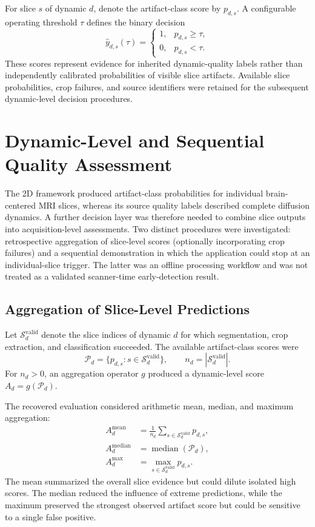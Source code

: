 For slice $s$ of dynamic $d$, denote the artifact-class score by $p_{d,s}$. A configurable operating threshold $\tau$ defines the binary decision
\begin{equation}
\hat y_{d,s}(\tau)=
\begin{cases}
1,&p_{d,s}\geq\tau,\\
0,&p_{d,s}<\tau.
\end{cases}
\end{equation}
These scores represent evidence for inherited dynamic-quality labels rather than independently calibrated probabilities of visible slice artifacts. Available slice probabilities, crop failures, and source identifiers were retained for the subsequent dynamic-level decision procedures.

\section{Dynamic-Level and Sequential Quality Assessment}
\label{sec:dynamic_sequential_assessment}

The 2D framework produced artifact-class probabilities for individual brain-centered MRI slices, whereas its source quality labels described complete diffusion dynamics. A further decision layer was therefore needed to combine slice outputs into acquisition-level assessments. Two distinct procedures were investigated: retrospective aggregation of slice-level scores (optionally incorporating crop failures) and a sequential demonstration in which the application could stop at an individual-slice trigger. The latter was an offline processing workflow and was not treated as a validated scanner-time early-detection result.

\subsection{Aggregation of Slice-Level Predictions}
\label{subsec:2d_dynamic_aggregation}

Let $\mathcal{S}^{\mathrm{valid}}_d$ denote the slice indices of dynamic $d$ for which segmentation, crop extraction, and classification succeeded. The available artifact-class scores were
\begin{equation}
\mathcal{P}_d=\{p_{d,s}:s\in\mathcal{S}^{\mathrm{valid}}_d\},
\qquad n_d=|\mathcal{S}^{\mathrm{valid}}_d|.
\end{equation}
For $n_d>0$, an aggregation operator $g$ produced a dynamic-level score $A_d=g(\mathcal{P}_d)$.

The recovered evaluation considered arithmetic mean, median, and maximum aggregation:
\begin{align}
A_d^{\mathrm{mean}}&=\frac{1}{n_d}\sum_{s\in\mathcal{S}^{\mathrm{valid}}_d}p_{d,s},\\
A_d^{\mathrm{median}}&=\operatorname{median}(\mathcal{P}_d),\\
A_d^{\mathrm{max}}&=\max_{s\in\mathcal{S}^{\mathrm{valid}}_d}p_{d,s}.
\end{align}
The mean summarized the overall slice evidence but could dilute isolated high scores. The median reduced the influence of extreme predictions, while the maximum preserved the strongest observed artifact score but could be sensitive to a single false positive.

